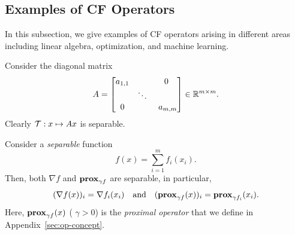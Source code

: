 \subsection{Examples of CF Operators}\label{sec:exp-cuf}
In this subsection, we give  examples of CF operators arising in different areas including linear algebra, optimization, and machine learning.
\begin{example}\label{exp:diagmat}
Consider the diagonal matrix
$$A = \begin{bmatrix}a_{1,1} & ~ & 0 \\  & \ddots&  \\ 0& ~& ~a_{m,m}\end{bmatrix}\in\RR^{m\times m}.$$
Clearly ${\mathcal{T}}:x\mapsto Ax$ is separable.
\end{example}
\begin{example}
Consider a \emph{separable} function
$$f(x) = \sum_{i=1}^m f_i(x_i).$$
Then, both $\nabla f$ and $\mathbf{prox}_{\gamma f}$ are separable, in particular,
$$(\nabla f(x))_i = \nabla f_i (x_i) \quad \mbox{and}\quad (\mathbf{prox}_{\gamma f}(x))_i= \mathbf{prox}_{\gamma f_i} (x_i).$$
Here, $\mathbf{prox}_{\gamma f} (x)$ ( $\gamma >0$) is the \emph{proximal operator} that we  define in Appendix~\ref{sec:op-concept}. %
\end{example}

